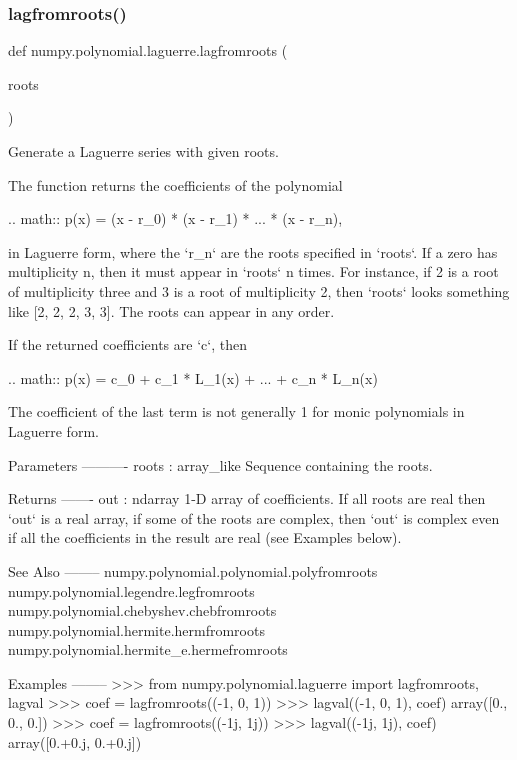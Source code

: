  \mbox{\label{namespacenumpy_1_1polynomial_1_1laguerre_a7fc895fe50b6da14a9a9972b880271ca}} 
\subsubsection{\texorpdfstring{lagfromroots()}{lagfromroots()}}
{\footnotesize\ttfamily def numpy.\+polynomial.\+laguerre.\+lagfromroots (\begin{DoxyParamCaption}\item[{}]{roots }\end{DoxyParamCaption})}

\begin{DoxyVerb}Generate a Laguerre series with given roots.

The function returns the coefficients of the polynomial

.. math:: p(x) = (x - r_0) * (x - r_1) * ... * (x - r_n),

in Laguerre form, where the `r_n` are the roots specified in `roots`.
If a zero has multiplicity n, then it must appear in `roots` n times.
For instance, if 2 is a root of multiplicity three and 3 is a root of
multiplicity 2, then `roots` looks something like [2, 2, 2, 3, 3]. The
roots can appear in any order.

If the returned coefficients are `c`, then

.. math:: p(x) = c_0 + c_1 * L_1(x) + ... +  c_n * L_n(x)

The coefficient of the last term is not generally 1 for monic
polynomials in Laguerre form.

Parameters
----------
roots : array_like
    Sequence containing the roots.

Returns
-------
out : ndarray
    1-D array of coefficients.  If all roots are real then `out` is a
    real array, if some of the roots are complex, then `out` is complex
    even if all the coefficients in the result are real (see Examples
    below).

See Also
--------
numpy.polynomial.polynomial.polyfromroots
numpy.polynomial.legendre.legfromroots
numpy.polynomial.chebyshev.chebfromroots
numpy.polynomial.hermite.hermfromroots
numpy.polynomial.hermite_e.hermefromroots

Examples
--------
>>> from numpy.polynomial.laguerre import lagfromroots, lagval
>>> coef = lagfromroots((-1, 0, 1))
>>> lagval((-1, 0, 1), coef)
array([0.,  0.,  0.])
>>> coef = lagfromroots((-1j, 1j))
>>> lagval((-1j, 1j), coef)
array([0.+0.j, 0.+0.j])\end{DoxyVerb}
 \mbox{\label{namespacenumpy_1_1polynomial_1_1laguerre_abe68bc18d3e9df3bb43bff1719f58687}} 
